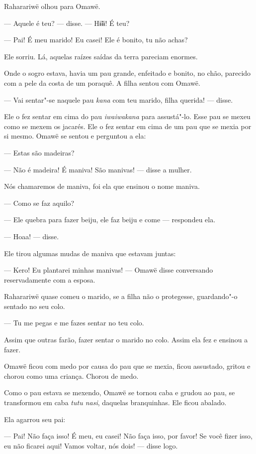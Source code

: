 Raharariwë olhou para Omawë. 

--- Aquele é teu? --- disse. --- Hɨ̃ɨɨ! É teu?

--- Pai! É meu marido! Eu casei! Ele é bonito, tu não achas? 

Ele sorriu. Lá, aquelas raízes saídas da terra pareciam enormes.

 Onde o sogro estava, havia um pau grande, enfeitado e bonito, no chão,
parecido com a pele da costa de um poraquê. A filha sentou com Omawë.

--- Vai sentar"-se naquele pau \emph{kana} com teu marido, filha
querida! --- disse. 

Ele o fez sentar em cima do pau \emph{iwaiwakana} para assustá"-lo. Esse
pau se mexeu como se mexem os jacarés. Ele o fez sentar em cima de um
pau que se mexia por si mesmo. Omawë se sentou e perguntou a ela: 

--- Estas são madeiras?

--- Não é madeira! É maniva! São manivas! --- disse a mulher. 

Nós chamaremos de maniva, foi ela que ensinou o nome maniva. 

--- Como se faz aquilo? 

--- Ele quebra para fazer beiju, ele faz beiju e come --- respondeu
ela. 

--- Hoaa! --- disse. 

Ele tirou algumas mudas de maniva que estavam juntas:

--- Kero! Eu plantarei minhas manivas! --- Omawë disse conversando
reservadamente com a esposa. 

Raharariwë quase comeu o marido, se a filha não o protegesse,
guardando"-o sentado no seu colo. 

--- Tu me pegas e me fazes sentar no teu colo. 

Assim que outras farão, fazer sentar o marido no colo. Assim ela fez e
ensinou a fazer. 

Omawë ficou com medo por causa do pau que se mexia, ficou assustado,
gritou e chorou como uma criança. Chorou de medo. 

Como o pau estava se mexendo, Omawë se tornou caba e grudou ao pau, se
transformou em caba \emph{tutu nasi}, daquelas branquinhas. Ele ficou
abalado. 

Ela agarrou seu pai: 

--- Pai! Não faça isso! É meu, eu casei! Não faça isso, por favor! Se
você fizer isso, eu não ficarei aqui! Vamos voltar, nós dois! --- disse
logo. 

